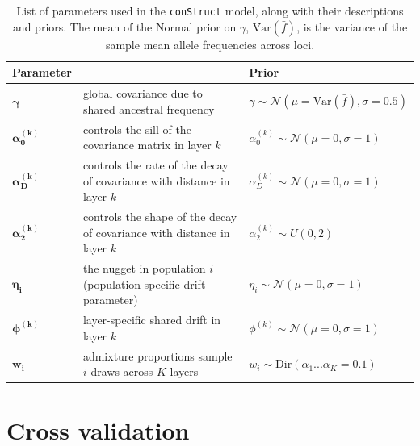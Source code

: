 \documentclass[10pt,letterpaper]{article}
\begin{document}
\begin{centering}
\begin{table}
\begin{tabular}{| >{\centering\arraybackslash}m{2.1cm} | m{5.2cm} | >{\centering\arraybackslash}m{5.1cm} |}
	\hline
	\textbf{Parameter} & \centering{\textbf{Description}} & \textbf{Prior}\\ \hline
	$\boldsymbol{\gamma}$ & 
		global covariance due to shared ancestral frequency & 
		$\gamma \sim \mathcal{N}(\mu = \text{Var}(\bar{f}), \sigma = 0.5)$\\ \hline
	$\boldsymbol{\alpha^{(k)}_0}$ & 
		controls the sill of the covariance matrix in layer $k$& 
		$\alpha^{(k)}_0 \sim \mathcal{N}(\mu = 0, \sigma = 1)$\\ \hline
	$\boldsymbol{\alpha^{(k)}_D}$ & 
		controls the rate of the decay of covariance with distance in layer $k$& 
		$\alpha^{(k)}_D \sim \mathcal{N}(\mu = 0, \sigma = 1)$\\ \hline
	$\boldsymbol{\alpha^{(k)}_2}$ & 
		controls the shape of the decay of covariance with distance in layer $k$ & 
		$\alpha^{(k)}_2 \sim U(0,2)$\\ \hline
	$\boldsymbol{\eta_i}$ & 
		the nugget in population $i$ (population specific drift parameter)  & 
		$\eta_i \sim \mathcal{N}(\mu = 0, \sigma = 1)$\\ \hline
	$\boldsymbol{\phi^{(k)}}$ & 
		layer-specific shared drift in layer $k$ &
		 $\phi^{(k)} \sim \mathcal{N}(\mu = 0, \sigma = 1)$\\ \hline
	$\boldsymbol{w_i}$ &
		admixture proportions sample $i$ draws across $K$ layers &
		$w_i \sim \text{Dir}(\alpha_{1} ... \alpha_{K}=0.1)$  \\ \hline
	\hline
\end{tabular}
\caption{
List of parameters used in the \texttt{conStruct} model, along with their descriptions and priors.
The mean of the Normal prior on $\gamma$, $\text{Var}(\bar{f})$, is the variance of the sample mean allele frequencies across loci.
}\label{tab:param_prior_tab}
\end{table}
\end{centering}

\newpage
\section*{Cross validation}\label{Xvalidation}
\end{document}
